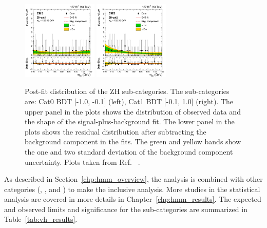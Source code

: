 \begin{figure}[!htb]
  \centering
  \captionsetup{justification=justified}
  \includegraphics[width=0.32\textwidth]{pics/VH_sec/VH_results/postfit_ZH_cat1.png}
  \includegraphics[width=0.32\textwidth]{pics/VH_sec/VH_results/postfit_ZH_cat2.png}
  \caption{Post-fit \mmm distribution of the ZH sub-categories. The sub-categories are: Cat0 BDT [-1.0, -0.1] (left), Cat1 BDT [-0.1, 1.0] (right). 
           The upper panel in the plots shows the distribution of observed data and the shape of the signal-plus-background fit.
           The lower panel in the plots shows the residual distribution after subtracting the background component in the fits.
           The green and yellow bands show the one and two standard deviation of the background component uncertainty.
           Plots taken from Ref. ~\cite{Sirunyan_2021}.}
  \label{fig:zh_postfit}
\end{figure}

As described in Section~\ref{chp:hmm_overview}, 
the \VH analysis is combined with other categories (\ggH, \qqH, and \ttH) to make the inclusive \hmm analysis.
More studies in the statistical analysis are covered in more details in Chapter~\ref{chp:hmm_results}.
The expected and observed limits and significance for the \VH sub-categories are summarized in Table~\ref{tab:vh_results}.

